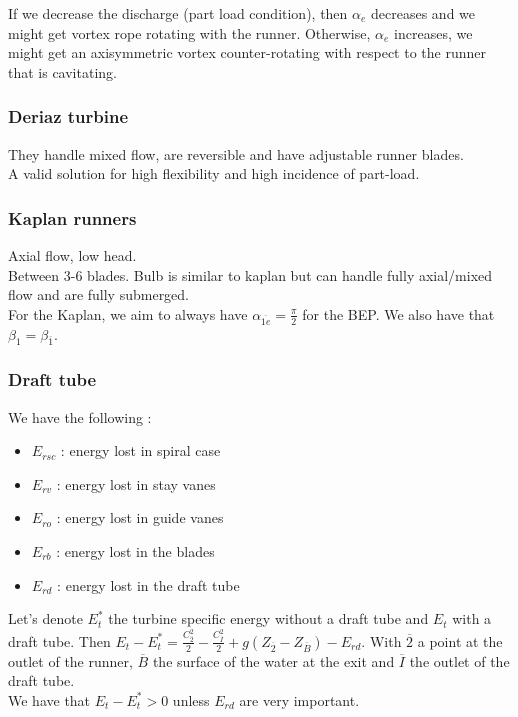 \documentclass[../main.tex]{subfiles}
\begin{document}
If we decrease the discharge (part load condition), then $\alpha_e$ decreases and we might get vortex rope rotating with the runner. Otherwise, $\alpha_e$ increases, we might get an axisymmetric vortex counter-rotating with respect to the runner that is cavitating.\\

\subsubsection{Deriaz turbine}
They handle mixed flow, are reversible and have adjustable runner blades.\\
A valid solution for high flexibility and high incidence of part-load.\\

\subsubsection{Kaplan runners}
Axial flow, low head.\\
Between 3-6 blades. Bulb is similar to kaplan but can handle fully axial/mixed flow and are fully submerged.\\

For the Kaplan, we aim to always have $\alpha_{\overline{1e}} = \frac{\pi}{2}$ for the BEP. We also have that $\beta_1 = \beta_{\overline{1}}$.

\subsubsection{Draft tube}
We have the following : \begin{itemize}
    \item $E_{rsc}$ : energy lost in spiral case
    \item $E_{rv}$ : energy lost in stay vanes
    \item $E_{ro}$ : energy lost in guide vanes
    \item $E_{rb}$ : energy lost in the blades
    \item $E_{rd}$ : energy lost in the draft tube
\end{itemize}

Let's denote $E_t^*$ the turbine specific energy without a draft tube and $E_t$ with a draft tube. Then $E_t - E_t^* = \frac{C_{\overline{2}}^2}{2} - \frac{C_{\overline{I}}^2}{2} + g(Z_{\overline{2}} - Z_{\overline{B}}) - E_{rd}$. With $\overline{2}$ a point at the outlet of the runner, $\overline{B}$ the surface of the water at the exit and $\overline{I}$ the outlet of the draft tube. \\
We have that $E_t - E_t^* >0$ unless $E_{rd}$ are very important.\\
\end{document}
